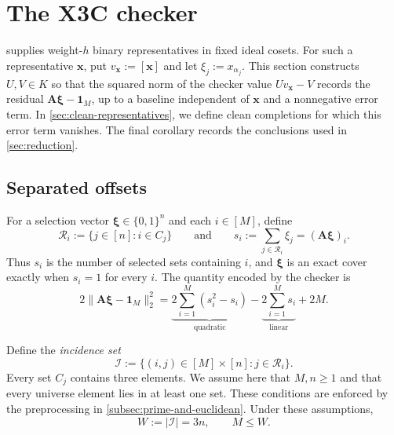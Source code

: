 \section{The X3C checker}
\label{sec:x3c-checker}

 supplies weight-$h$ binary representatives in
fixed ideal cosets.  For such a representative $\mathbf x$, put
$v_{\mathbf x}:=[\mathbf x]$ and let $\xi_j:=x_{\alpha_j}$.  This section
constructs $U,V\in K$ so that the squared norm of the checker value
$Uv_{\mathbf x}-V$ records the residual
$\mathbf A\boldsymbol\xi-\mathbf1_M$, up to a baseline independent of
$\mathbf x$ and a nonnegative error term.  In
\cref{sec:clean-representatives}, we define clean completions for which this
error term vanishes.  The final corollary records the conclusions used in
\cref{sec:reduction}.

\subsection{Separated offsets}
\label{sec:separated-offsets}

For a selection vector $\boldsymbol\xi\in\{0,1\}^n$ and each $i\in[M]$, define
\[
 \mathcal R_i:=\{j\in[n]:i\in C_j\}
 \qquad\text{and}\qquad
 s_i:=\sum_{j\in\mathcal R_i}\xi_j=(\mathbf A\boldsymbol\xi)_i.
\]
Thus $s_i$ is the number of selected sets containing $i$, and
$\boldsymbol\xi$ is an exact cover exactly when $s_i=1$ for every $i$.  The
quantity encoded by the checker is
\begin{equation}
\label{eq:checker-target-decomposition}
 2\|\mathbf A\boldsymbol\xi-\mathbf1_M\|_2^2
 =
   \underbrace{2\sum_{i=1}^M(s_i^2-s_i)}_{\text{quadratic}}
   -\underbrace{2\sum_{i=1}^M s_i}_{\text{linear}}
   +2M.
\end{equation}

Define the \emph{incidence set}
\[
 \mathcal I:=\{(i,j)\in[M]\times[n]:j\in\mathcal R_i\}.
\]
Every set $C_j$ contains three elements.  We assume here that
$M,n\ge1$ and that every universe element lies in at least one set.  These
conditions are enforced by the preprocessing in
\cref{subsec:prime-and-euclidean}.  Under these assumptions,
\begin{equation}
\label{eq:incidence-count}
 W:=|\mathcal I|=3n,
 \qquad M\le W.
\end{equation}

